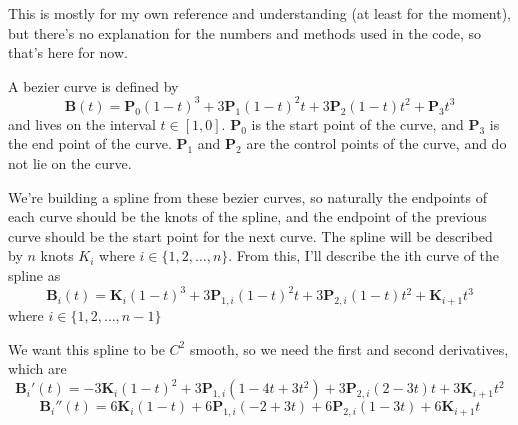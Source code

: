 \documentclass[10pt]{article}
\begin{document}
	This is mostly for my own reference and understanding (at least for the moment), but there's no explanation for the numbers and methods used in the code, so that's here for now.

	A bezier curve is defined by
	\begin{equation}
		\textbf{B}(t) = \textbf{P}_{0}(1-t)^{3} + 3\textbf{P}_{1}(1-t)^{2}t + 3\textbf{P}_{2}(1-t)t^{2} + \textbf{P}_{3}t^{3} \nonumber
	\end{equation}
	and lives on the interval $t\in[1,0]$. $\textbf{P}_{0}$ is the start point of the curve, and $\textbf{P}_{3}$ is the end point of the curve. $\textbf{P}_{1}$ and $\textbf{P}_{2}$ are the control points of the curve, and do not lie on the curve.

	We're building a spline from these bezier curves, so naturally the endpoints of each curve should be the knots of the spline, and the endpoint of the previous curve should be the start point for the next curve. The spline will be described by $n$ knots $K_{i}$ where $i \in \{1, 2, \dots, n\}$. From this, I'll describe the ith curve of the spline as
	\begin{equation}
		\textbf{B}_{i}(t) = \textbf{K}_{i}(1-t)^{3} + 3\textbf{P}_{1,i}(1-t)^{2}t + 3\textbf{P}_{2,i}(1-t)t^{2} + \textbf{K}_{i+1}t^{3}
	\end{equation}
	where $i \in \{1, 2, \dots, n - 1\}$

	We want this spline to be $C^{2}$ smooth, so we need the first and second derivatives, which are
	\begin{equation}
		\textbf{B}_{i}'(t) = -3\textbf{K}_{i}(1 - t)^{2} + 3\textbf{P}_{1,i}(1 - 4t + 3t^{2}) + 3\textbf{P}_{2,i}(2 - 3t)t + 3\textbf{K}_{i+1}t^{2}
	\end{equation}
	\begin{equation}
		\textbf{B}_{i}''(t) = 6\textbf{K}_{i}(1 - t) + 6\textbf{P}_{1,i}(-2 + 3t) + 6\textbf{P}_{2,i}(1 - 3t) + 6\textbf{K}_{i+1}t
	\end{equation}
\end{document}
